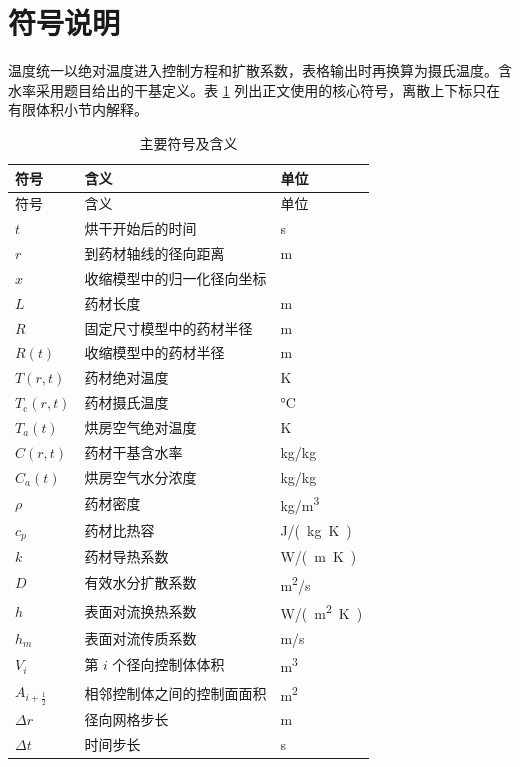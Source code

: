 \documentclass[withoutpreface,bwprint]{cumcmthesis}
\begin{document}
\section{符号说明}

温度统一以绝对温度进入控制方程和扩散系数，表格输出时再换算为摄氏温度。含水率采用题目给出的干基定义。表 \ref{tab:symbols} 列出正文使用的核心符号，离散上下标只在有限体积小节内解释。

\begin{longtable}{>{\centering\arraybackslash}p{}
                  p{}
                  >{\centering\arraybackslash}p{}}
\caption{主要符号及含义}\label{tab:symbols}\\
\toprule
符号 & 含义 & 单位\\
\midrule
\endfirsthead
\toprule
符号 & 含义 & 单位\\
\midrule
\endhead
\bottomrule
\endfoot
\(t\) & 烘干开始后的时间 & \si{s}\\
\(r\) & 到药材轴线的径向距离 & \si{m}\\
\(x\) & 收缩模型中的归一化径向坐标 & 1\\
\(L\) & 药材长度 & \si{m}\\
\(R\) & 固定尺寸模型中的药材半径 & \si{m}\\
\(R(t)\) & 收缩模型中的药材半径 & \si{m}\\
\(T(r,t)\) & 药材绝对温度 & \si{K}\\
\(T_{\mathrm{c}}(r,t)\) & 药材摄氏温度 & \si{\degreeCelsius}\\
\(T_a(t)\) & 烘房空气绝对温度 & \si{K}\\
\(C(r,t)\) & 药材干基含水率 & \si{kg/kg}\\
\(C_a(t)\) & 烘房空气水分浓度 & \si{kg/kg}\\
\(\rho\) & 药材密度 & \si{kg/m^3}\\
\(c_p\) & 药材比热容 & \si{J/(kg.K)}\\
\(k\) & 药材导热系数 & \si{W/(m.K)}\\
\(D\) & 有效水分扩散系数 & \si{m^2/s}\\
\(h\) & 表面对流换热系数 & \si{W/(m^2.K)}\\
\(h_m\) & 表面对流传质系数 & \si{m/s}\\
\(V_i\) & 第 \(i\) 个径向控制体体积 & \si{m^3}\\
\(A_{i+\frac12}\) & 相邻控制体之间的控制面面积 & \si{m^2}\\
\(\Delta r\) & 径向网格步长 & \si{m}\\
\(\Delta t\) & 时间步长 & \si{s}\\
\end{longtable}
\end{document}
